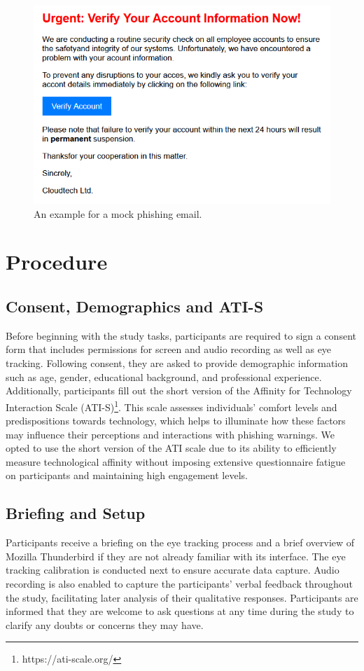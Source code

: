 \documentclass[
  a4paper,  %
  twoside,  %
  bibliography=totoc,
  headsepline,
  cleardoublepage=empty,
  parskip=half,
  draft=false
]{scrbook}
\begin{document}
\begin{figure} [ht]
    \centering
    \includegraphics[width=0.6\linewidth]{figures/example.png}
    \caption{An example for a mock phishing email.}
    \label{fig:example}
\end{figure}

\section{Procedure}

\subsection{Consent, Demographics and ATI-S}

Before beginning with the study tasks, participants are required to sign a consent form that includes permissions for screen and audio recording as well as eye tracking. Following consent, they are asked to provide demographic information such as age, gender, educational background, and professional experience. Additionally, participants fill out the short version of the Affinity for Technology Interaction Scale (ATI-S)\footnote{https://ati-scale.org/}. This scale assesses individuals' comfort levels and predispositions towards technology, which helps to illuminate how these factors may influence their perceptions and interactions with phishing warnings. \newline
We opted to use the short version of the ATI scale due to its ability to efficiently measure technological affinity without imposing extensive questionnaire fatigue on participants and maintaining high engagement levels.

\subsection{Briefing and Setup}

Participants receive a briefing on the eye tracking process and a brief overview of Mozilla Thunderbird if they are not already familiar with its interface. The eye tracking calibration is conducted next to ensure accurate data capture. Audio recording is also enabled to capture the participants' verbal feedback throughout the study, facilitating later analysis of their qualitative responses. Participants are informed that they are welcome to ask questions at any time during the study to clarify any doubts or concerns they may have.
\end{document}
